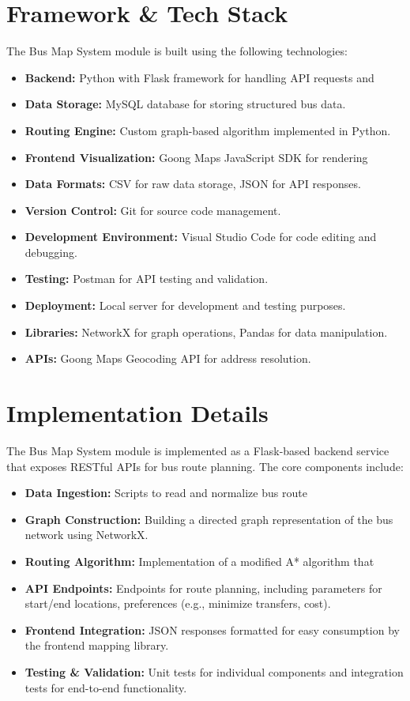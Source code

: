 \section{Framework \& Tech Stack}
The Bus Map System module is built using the following technologies:
\begin{itemize}
    \item \textbf{Backend:} Python with Flask framework for handling API requests and
    \item \textbf{Data Storage:} MySQL database for storing structured bus data.
    \item \textbf{Routing Engine:} Custom graph-based algorithm implemented in Python.
    \item \textbf{Frontend Visualization:} Goong Maps JavaScript SDK for rendering
    \item \textbf{Data Formats:} CSV for raw data storage, JSON for API responses.
    \item \textbf{Version Control:} Git for source code management.
    \item \textbf{Development Environment:} Visual Studio Code for code editing and debugging.
    \item \textbf{Testing:} Postman for API testing and validation.
    \item \textbf{Deployment:} Local server for development and testing purposes.
    \item \textbf{Libraries:} NetworkX for graph operations, Pandas for data manipulation.
    \item \textbf{APIs:} Goong Maps Geocoding API for address resolution.
\end{itemize}

\section{Implementation Details}
The Bus Map System module is implemented as a Flask-based backend service that exposes RESTful APIs for bus route planning. The core components include:
\begin{itemize}
    \item \textbf{Data Ingestion:} Scripts to read and normalize bus route
    \item \textbf{Graph Construction:} Building a directed graph representation of the bus network using NetworkX.
    \item \textbf{Routing Algorithm:} Implementation of a modified A* algorithm that
    \item  \textbf{API Endpoints:} Endpoints for route planning, including parameters for start/end locations, preferences (e.g., minimize transfers, cost).
    \item \textbf{Frontend Integration:} JSON responses formatted for easy consumption by the frontend mapping library.
    \item \textbf{Testing \& Validation:} Unit tests for individual components and integration tests for end-to-end functionality.
\end{itemize}

